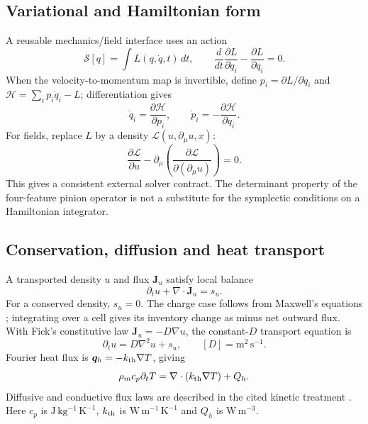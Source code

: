 \documentclass[11pt,a4paper]{article}
\numberwithin{equation}{section}
\begin{document}
\subsection{Variational and Hamiltonian form}
A reusable mechanics/field interface uses an action \cite[Ch.~19]{action}
\begin{equation}
\mathcal S[q]=\int L(q,\dot q,t)\,dt,\qquad
\frac{d}{dt}\frac{\partial L}{\partial\dot q_i}-\frac{\partial L}{\partial q_i}=0.
\end{equation}
When the velocity-to-momentum map is invertible, define $p_i=\partial L/\partial\dot q_i$ and $\mathcal H=\sum_i p_i\dot q_i-L$; differentiation gives
\begin{equation}
\dot q_i=\frac{\partial\mathcal H}{\partial p_i},\qquad
\dot p_i=-\frac{\partial\mathcal H}{\partial q_i}.
\end{equation}
For fields, replace $L$ by a density $\mathcal L(u,\partial_\mu u,x)$:
\begin{equation}
\frac{\partial\mathcal L}{\partial u}
-\partial_\mu\!\left(\frac{\partial\mathcal L}{\partial(\partial_\mu u)}\right)=0.
\end{equation}
This gives a consistent external solver contract. The determinant property of the four-feature pinion operator is not a substitute for the symplectic conditions on a Hamiltonian integrator.

\subsection{Conservation, diffusion and heat transport}
A transported density $u$ and flux $\bm J_u$ satisfy local balance
\begin{equation}
\partial_tu+\nabla\cdot\bm J_u=s_u.
\label{eq:continuity}
\end{equation}
For a conserved density, $s_u=0$. The charge case follows from Maxwell's equations \cite{maxwell}; integrating over a cell gives its inventory change as minus net outward flux. With Fick's constitutive law $\bm J_u=-D\nabla u$, the constant-$D$ transport equation is
\begin{equation}
\partial_tu=D\nabla^2u+s_u,\qquad [D]=\mathrm{m^2\,s^{-1}}.
\end{equation}
Fourier heat flux is $\bm q_h=-k_{\rm th}\nabla T$, giving
\begin{equation}
\rho_m c_p\partial_tT=\nabla\cdot(k_{\rm th}\nabla T)+Q_h.
\end{equation}
Diffusive and conductive flux laws are described in the cited kinetic treatment \cite[Secs.~43--5 and 43--6]{diffusion}. Here $c_p$ is $\mathrm{J\,kg^{-1}\,K^{-1}}$, $k_{\rm th}$ is $\mathrm{W\,m^{-1}\,K^{-1}}$ and $Q_h$ is $\mathrm{W\,m^{-3}}$.
\end{document}
